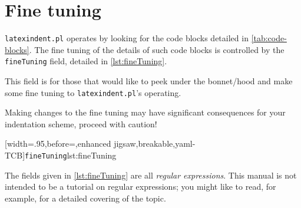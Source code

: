 \section{Fine tuning}\label{sec:finetuning}
 \texttt{latexindent.pl} operates by looking for the code blocks detailed in
 \vref{tab:code-blocks}.
  The fine tuning of the
 details of such code blocks is controlled by the \texttt{fineTuning} field, detailed in
 \cref{lst:fineTuning}.

 This field is for those that would like to peek under the bonnet/hood and make some fine
 tuning to \texttt{latexindent.pl}'s operating. 
  
      
      

 \begin{warning}
  Making changes to the fine tuning may have significant consequences for your
  indentation scheme, proceed with caution!
 \end{warning}

 \begin{widepage}
  [width=.95\linewidth,before=\centering,enhanced jigsaw,breakable,yaml-TCB]{\texttt{fineTuning}}{lst:fineTuning}
 \end{widepage}

 The fields given in \cref{lst:fineTuning} are all \emph{regular expressions}. This
 manual is not intended to be a tutorial on regular expressions; you might like to read,
 for example, \cite{masteringregexp} for a detailed covering of the topic.

